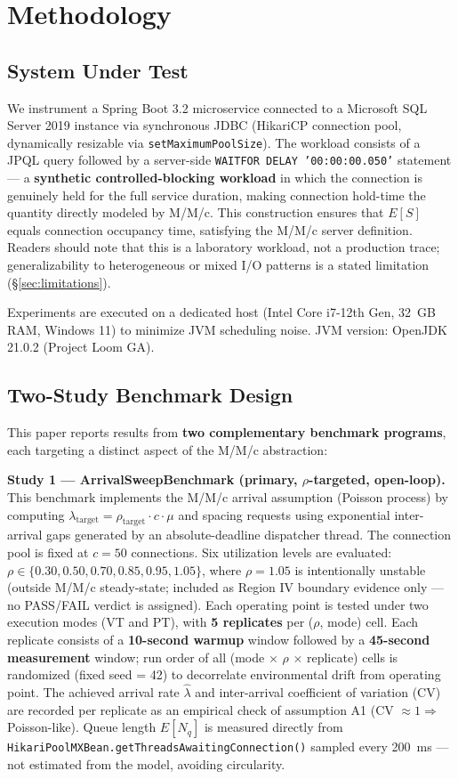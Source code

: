 \documentclass[10pt]{article}
\begin{document}
\section{Methodology}

\subsection{System Under Test}

We instrument a Spring Boot 3.2 microservice connected to a Microsoft SQL Server 2019 instance via synchronous JDBC (HikariCP connection pool, dynamically resizable via \texttt{setMaximumPoolSize}). The workload consists of a JPQL query followed by a server-side \texttt{WAITFOR DELAY '00:00:00.050'} statement --- a \textbf{synthetic controlled-blocking workload} in which the connection is genuinely held for the full service duration, making connection hold-time the quantity directly modeled by M/M/c. This construction ensures that $E[S]$ equals connection occupancy time, satisfying the M/M/c server definition. Readers should note that this is a laboratory workload, not a production trace; generalizability to heterogeneous or mixed I/O patterns is a stated limitation (\S\ref{sec:limitations}).

Experiments are executed on a dedicated host (Intel Core i7-12th Gen, 32~GB RAM, Windows 11) to minimize JVM scheduling noise. JVM version: OpenJDK 21.0.2 (Project Loom GA).

\subsection{Two-Study Benchmark Design}

This paper reports results from \textbf{two complementary benchmark programs}, each targeting a distinct aspect of the M/M/c abstraction:

\textbf{Study 1 --- ArrivalSweepBenchmark (primary, $\rho$-targeted, open-loop).} This benchmark implements the M/M/c arrival assumption (Poisson process) by computing $\lambda_{\text{target}} = \rho_{\text{target}}\cdot c\cdot\mu$ and spacing requests using exponential inter-arrival gaps generated by an absolute-deadline dispatcher thread. The connection pool is fixed at $c = 50$ connections. Six utilization levels are evaluated: $\rho \in \{0.30, 0.50, 0.70, 0.85, 0.95, 1.05\}$, where $\rho = 1.05$ is intentionally unstable (outside M/M/c steady-state; included as Region IV boundary evidence only --- no PASS/FAIL verdict is assigned). Each operating point is tested under two execution modes (VT and PT), with \textbf{5 replicates} per ($\rho$, mode) cell. Each replicate consists of a \textbf{10-second warmup} window followed by a \textbf{45-second measurement} window; run order of all (mode $\times$ $\rho$ $\times$ replicate) cells is randomized (fixed seed = 42) to decorrelate environmental drift from operating point. The achieved arrival rate $\hat\lambda$ and inter-arrival coefficient of variation (CV) are recorded per replicate as an empirical check of assumption A1 (CV $\approx 1 \Rightarrow$ Poisson-like). Queue length $E[N_q]$ is measured directly from \texttt{HikariPoolMXBean.getThreadsAwaitingConnection()} sampled every 200~ms --- not estimated from the model, avoiding circularity.
\end{document}
